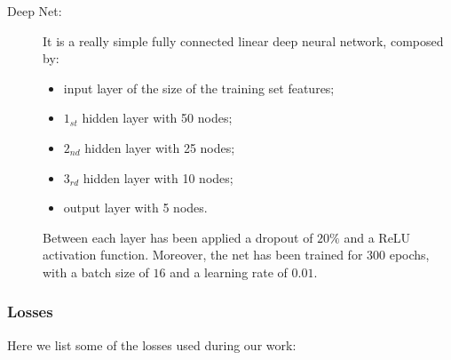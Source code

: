\documentclass{article}
\begin{document}
\begin{description}
\item [Deep Net:] It is a really simple fully connected linear deep neural network, composed by: \begin{itemize}
\item input layer of the size of the training set features;
\item $1_{st}$ hidden layer with 50 nodes;
\item $2_{nd}$ hidden layer with 25 nodes;
\item $3_{rd}$ hidden layer with 10 nodes;
\item output layer with 5 nodes.
\end{itemize}
Between each layer has been applied a dropout of $20\%$  and a ReLU activation function. Moreover, the net has been trained for $300$ epochs, with a batch size of $16$ and a learning rate of $0.01$.
\end{description}




\subsubsection{Losses}

Here we list some of the losses used during our work:
\end{document}
